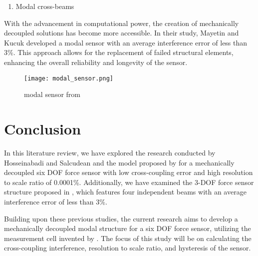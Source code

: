 \begin{enumerate}[resume]
    \item Modal cross-beams
\end{enumerate}

With the advancement in computational power, the creation of mechanically decoupled solutions has become more accessible. 
In their study, Mayetin and Kucuk \cite{modal_sensor} developed a modal sensor with an average interference error of less than 3\%.
This approach allows for the replacement of failed structural elements, enhancing the overall reliability and longevity of the sensor.
\begin{figure}[H]
    \label{fig:modal_sensor}
    \texttt{[image: modal\_sensor.png]}
    \caption*{modal sensor from \cite{modal_sensor}}
\end{figure}



\section{Conclusion}
\label{lr_conclusion}
In this literature review, we have explored the research conducted by Hosseinabadi and Salcudean \cite{perfect_sensor} and the model proposed by
 \cite{my_love_pressure_photosensor} for a mechanically decoupled six DOF force sensor with low cross-coupling error and high resolution to scale 
 ratio of 0.0001\%. 
 Additionally, we have examined the 3-DOF force sensor structure proposed in \cite{modal_sensor}, 
 which features four independent beams with an average interference error of less than \( 3 \% \).

Building upon these previous studies, the current research aims to develop a mechanically decoupled modal structure for a six DOF force sensor,
utilizing the measurement cell invented by \cite*{my_love_pressure_photosensor}. 
The focus of this study will be on calculating the cross-coupling interference, resolution to scale ratio, and hysteresis of the sensor. 

